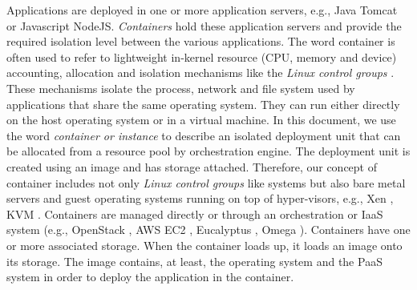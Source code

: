 Applications are deployed in one or more application servers, e.g., Java Tomcat or Javascript NodeJS. \emph{Containers} \cite{Lenk2009} hold these application servers and provide the required isolation level between the various applications. The word container is often used to refer to lightweight in-kernel resource (CPU, memory and device) accounting, allocation and isolation mechanisms like the \textit{Linux control groups} \cite{Menage2007}. These mechanisms isolate the process, network and file system used by applications that share the same operating system. They can run either directly on the host operating system or in a virtual machine. In this document, we use the word \textit{container or instance} to describe an isolated deployment unit that can be allocated from a resource pool by orchestration engine. The deployment unit is created using an image and has storage attached. Therefore, our concept of container includes not only \textit{Linux control groups} like systems but also bare metal servers and guest operating systems running on top of hyper-visors, e.g., Xen \cite{xen}, KVM \cite{kvm}. Containers are managed directly or through an orchestration or IaaS system (e.g., OpenStack \cite{openstack}, \ac{AWS} \ac{EC2} \cite{aws}, Eucalyptus \cite{eucalyptus}, Omega \cite{omega}). Containers have one or more associated storage. When the container loads up, it loads an image onto its storage. The image contains, at least, the operating system and the \ac{PaaS} system in order to deploy the application in the container. 

